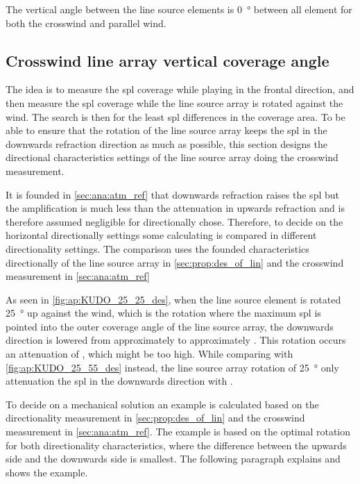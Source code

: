 
The vertical angle between the line source elements is \SI{0}{\degree} between all element for both the crosswind and parallel wind.  

\subsection{Crosswind line array vertical coverage angle} \label{sub:des:cros_set}
The idea is to measure the \gls{spl} coverage while playing in the frontal direction, and then measure the \gls{spl} coverage while the line source array is rotated against the wind. The search is then for the least \gls{spl} differences in the coverage area. To be able to ensure that the rotation of the line source array keeps the \gls{spl} in the downwards refraction direction as much as possible, this section designs the directional characteristics settings of the line source array doing the crosswind measurement.

It is founded in \autoref{sec:ana:atm_ref} that downwards refraction raises the \gls{spl} but the amplification is much less than the attenuation in upwards refraction and is therefore assumed negligible for directionally chose. Therefore, to decide on the horizontal directionally settings some calculating is compared in different directionality settings. The comparison uses the founded characteristics directionally of the line source array in \autoref{sec:prop:des_of_lin} and the crosswind measurement in \autoref{sec:ana:atm_ref}

As seen in \autoref{fig:ap:KUDO_25_25_des}, when the line source element is rotated \SI{25}{\degree} up against the wind, which is the rotation where the maximum \gls{spl} is pointed into the outer  coverage angle of the line source array, the downwards direction is lowered from approximately  to approximately . This rotation occurs an attenuation of , which might be too high. While comparing with \autoref{fig:ap:KUDO_25_55_des} instead, the line source array rotation of \SI{25}{\degree} only attenuation the \gls{spl} in the downwards direction with . 

To decide on a mechanical solution an example is calculated based on the directionality measurement in \autoref{sec:prop:des_of_lin} and the crosswind measurement in \autoref{sec:ana:atm_ref}. The example is based on the optimal rotation for both directionality characteristics, where the difference between the upwards side and the downwards side is smallest. The following paragraph explains and shows the example.


